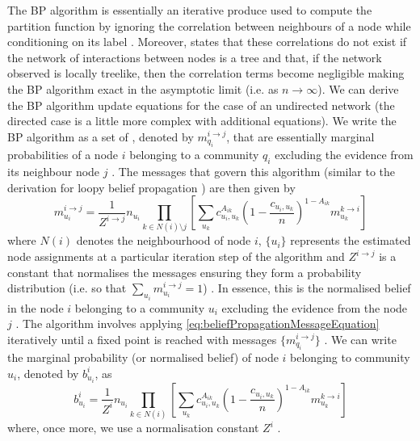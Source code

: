 The BP algorithm is essentially an iterative produce used to compute the partition function by ignoring the correlation between neighbours of a node while conditioning on its label \cite{DKM+13}.
Moreover, \cite{DKM+13} states that these correlations do not exist if the network of interactions between nodes is a tree and that, if the network observed is locally treelike, then the correlation terms become negligible making the BP algorithm exact in the asymptotic limit (i.e. as $n \rightarrow \infty$).
We can derive the BP algorithm update equations for the case of an undirected network (the directed case is a little more complex with additional equations).
We write the BP algorithm as a set of , denoted by $m_{q_{i}}^{i \rightarrow j}$, that are essentially marginal probabilities of a node $i$ belonging to a community $q_{i}$ excluding the evidence from its neighbour node $j$ \cite{DKM+13}.
The messages that govern this algorithm (similar to the derivation for loopy belief propagation \cite{Gil14a}) are then given by
\begin{equation}
	\label{eq:beliefPropagationMessageEquation}
	m_{u_{i}}^{i \rightarrow j} = \frac{1}{Z^{i \rightarrow j}} n_{u_{i}} \prod_{k \in N(i) \setminus j} \left[ \sum_{u_{k}} c_{u_{i},u_{k}}^{A_{ik}} \left(1 - \frac{c_{u_{i},u_{k}}}{n} \right)^{1-A_{ik}} m_{u_{k}}^{k \rightarrow i} \right]
\end{equation}
where $N(i)$ denotes the neighbourhood of node $i$, $\{ u_{i} \}$ represents the estimated node assignments at a particular iteration step of the algorithm and $Z^{i \rightarrow j}$ is a constant that normalises the messages ensuring they form a probability distribution (i.e. so that $\sum_{u_{i}} m_{u_{i}}^{i \rightarrow j} = 1$) \cite{DKM+13}.
In essence, this is the normalised belief in the node $i$ belonging to a community $u_{i}$ excluding the evidence from the node $j$ \cite{Gil14a}.
The algorithm involves applying \cref{eq:beliefPropagationMessageEquation} iteratively until a fixed point is reached with messages $\{ m_{q_{i}}^{i \rightarrow j}  \}$ \cite{DKM+13}.
We can write the marginal probability (or normalised belief) of node $i$ belonging to community $u_{i}$, denoted by $b_{u_{i}}^{i}$, as
\begin{equation}
	\label{eq:beliefPropagationBeliefEquation}
	b_{u_{i}}^{i} = \frac{1}{Z^{i}} n_{u_{i}} \prod_{k \in N(i)} \left[ \sum_{u_{k}} c_{u_{i},u_{k}}^{A_{ik}} \left(1 - \frac{c_{u_{i},u_{k}}}{n} \right)^{1-A_{ik}} m_{u_{k}}^{k \rightarrow i} \right]
\end{equation}
where, once more, we use a normalisation constant $Z^{i}$ \cite{DKM+13}.

